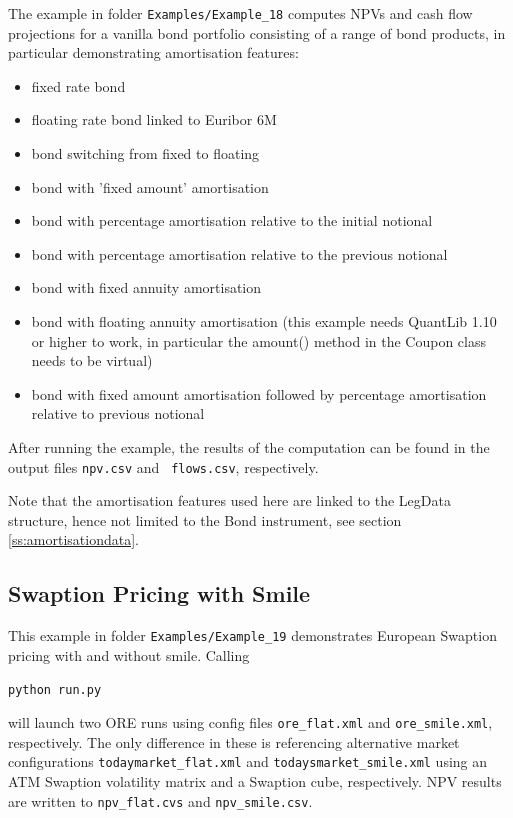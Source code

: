 \documentclass[12pt, a4paper]{article}
\begin{document}
The example in folder {\tt Examples/Example\_18} computes NPVs and cash flow projections for a vanilla bond portfolio
consisting of a range of bond products, in particular demonstrating amortisation features:
\begin{itemize}
\item fixed rate bond
\item floating rate bond linked to Euribor 6M
\item bond switching from fixed to floating
\item bond with 'fixed amount' amortisation
\item bond with percentage amortisation relative to the initial notional
\item bond with percentage amortisation relative to the previous notional
\item bond with fixed annuity amortisation
\item bond with floating annuity amortisation (this example needs QuantLib 1.10 or higher to work, in particular the amount() method in the Coupon class needs to be virtual)
\item bond with fixed amount amortisation followed by percentage amortisation relative to previous notional
\end{itemize}

After running the example, the results of the computation can be found in the output files {\tt npv.csv} and {\tt
  flows.csv}, respectively.

\medskip
Note that the amortisation features used here are linked to the LegData structure, hence not limited to the Bond instrument, see section \ref{ss:amortisationdata}.

\subsection{Swaption Pricing with Smile}%

This example in folder {\tt Examples/Example\_19} demonstrates European Swaption pricing with and without smile. Calling

\medskip
\centerline{\tt python run.py}

\medskip
will launch two ORE runs using config files {\tt ore\_flat.xml} and {\tt ore\_smile.xml}, respectively. The only difference in these is referencing alternative market configurations {\tt todaymarket\_flat.xml} and {\tt todaysmarket\_smile.xml} using an ATM Swaption volatility matrix and a Swaption cube, respectively. NPV results are written to {\tt npv\_flat.cvs} and {\tt npv\_smile.csv}.
\end{document}
